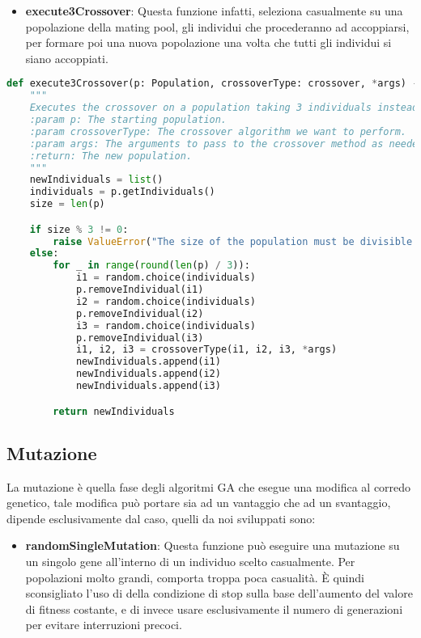\documentclass{article}
\begin{document}
\begin{itemize}
\item\textbf{execute3Crossover}: Questa funzione infatti, seleziona casualmente su una popolazione della mating pool, gli individui che procederanno ad accoppiarsi, per formare poi una nuova popolazione una volta che tutti gli individui si siano accoppiati.
\end{itemize}

\begin{lstlisting}[language=Python]
def execute3Crossover(p: Population, crossoverType: crossover, *args) -> list[Individual]:
    """
    Executes the crossover on a population taking 3 individuals instead of 2.
    :param p: The starting population.
    :param crossoverType: The crossover algorithm we want to perform.
    :param args: The arguments to pass to the crossover method as needed.
    :return: The new population.
    """
    newIndividuals = list()
    individuals = p.getIndividuals()
    size = len(p)

    if size % 3 != 0:
        raise ValueError("The size of the population must be divisible by 3!")
    else:
        for _ in range(round(len(p) / 3)):
            i1 = random.choice(individuals)
            p.removeIndividual(i1)
            i2 = random.choice(individuals)
            p.removeIndividual(i2)
            i3 = random.choice(individuals)
            p.removeIndividual(i3)
            i1, i2, i3 = crossoverType(i1, i2, i3, *args)
            newIndividuals.append(i1)
            newIndividuals.append(i2)
            newIndividuals.append(i3)

        return newIndividuals
\end{lstlisting}



\pagebreak

\subsection{Mutazione}

La mutazione è quella fase degli algoritmi GA che esegue una modifica al corredo genetico, tale modifica può portare sia ad un vantaggio che ad un svantaggio, dipende esclusivamente dal caso, quelli da noi sviluppati sono:

\begin{itemize}
\item\textbf{randomSingleMutation}: Questa funzione può eseguire una mutazione su un singolo gene all'interno di un individuo scelto casualmente.
Per popolazioni molto grandi, comporta troppa poca casualità. È quindi sconsigliato l'uso di della condizione di stop sulla base dell'aumento del valore di fitness costante, e di invece usare esclusivamente il numero di generazioni per evitare interruzioni precoci.
\end{itemize}
\end{document}

